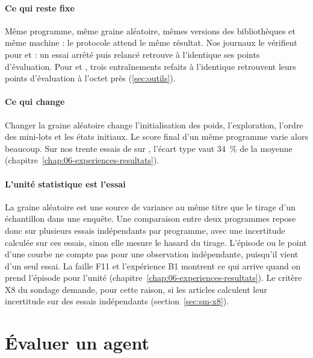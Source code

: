 \paragraph{Ce qui reste fixe}
Même programme, même graine aléatoire, mêmes versions des bibliothèques et même machine : le protocole
attend le même résultat. Nos journaux le vérifient pour  et  : un essai
arrêté puis relancé retrouve à l'identique ses points d'évaluation. Pour  et ,
trois entraînements refaits à l'identique retrouvent leurs points d'évaluation à l'octet près
(\cref{sec:outils}).

\paragraph{Ce qui change}
Changer la graine aléatoire change l'initialisation des poids, l'exploration, l'ordre des mini-lots et
les états initiaux. Le score final d'un même programme varie alors
beaucoup. Sur nos trente essais de  sur , l'écart type vaut 34~\% de
la moyenne (chapitre~\ref{chap:06-experiences-resultats}).

\paragraph{L'unité statistique est l'essai}
La graine aléatoire est une source de variance au même titre que le tirage d'un échantillon dans une
enquête. Une comparaison entre deux programmes repose donc sur plusieurs essais indépendants par
programme, avec une incertitude calculée sur ces essais, sinon elle mesure le hasard du tirage.
L'épisode ou le point d'une courbe ne compte pas pour une observation indépendante, puisqu'il vient
d'un seul essai. La faille F11 et l'expérience B1 montrent ce qui arrive quand on prend l'épisode pour
l'unité (chapitre~\ref{chap:06-experiences-resultats}). Le critère X8 du sondage demande, pour cette
raison, si les articles calculent leur incertitude sur des essais indépendants
(section~\ref{sec:sm-x8}).

\section{Évaluer un agent}\label{sec:ctx-evaluation}

